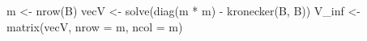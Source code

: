 \begin{Schunk}
\begin{Sinput}
 m <- nrow(B)
 vecV <- solve(diag(m * m) - kronecker(B, B)) %*% as.vector(Q)
 V_inf <- matrix(vecV, nrow = m, ncol = m)
\end{Sinput}
\end{Schunk}
